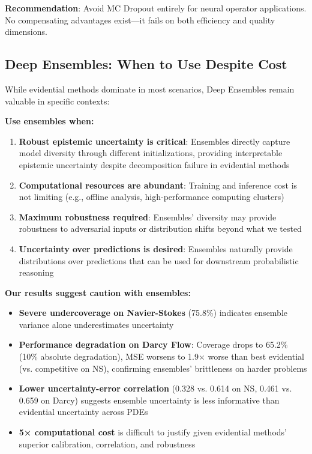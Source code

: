 \textbf{Recommendation}: Avoid MC Dropout entirely for neural operator applications. No compensating advantages exist—it fails on both efficiency and quality dimensions.

\subsection{Deep Ensembles: When to Use Despite Cost}

While evidential methods dominate in most scenarios, Deep Ensembles remain valuable in specific contexts:

\textbf{Use ensembles when:}
\begin{enumerate}
\item \textbf{Robust epistemic uncertainty is critical}: Ensembles directly capture model diversity through different initializations, providing interpretable epistemic uncertainty despite decomposition failure in evidential methods

\item \textbf{Computational resources are abundant}: Training and inference cost is not limiting (e.g., offline analysis, high-performance computing clusters)

\item \textbf{Maximum robustness required}: Ensembles' diversity may provide robustness to adversarial inputs or distribution shifts beyond what we tested

\item \textbf{Uncertainty over predictions is desired}: Ensembles naturally provide distributions over predictions that can be used for downstream probabilistic reasoning
\end{enumerate}

\textbf{Our results suggest caution with ensembles:}
\begin{itemize}
\item \textbf{Severe undercoverage on Navier-Stokes} (75.8\%) indicates ensemble variance alone underestimates uncertainty
\item \textbf{Performance degradation on Darcy Flow}: Coverage drops to 65.2\% (10\% absolute degradation), MSE worsens to 1.9× worse than best evidential (vs. competitive on NS), confirming ensembles' brittleness on harder problems
\item \textbf{Lower uncertainty-error correlation} (0.328 vs. 0.614 on NS, 0.461 vs. 0.659 on Darcy) suggests ensemble uncertainty is less informative than evidential uncertainty across PDEs
\item \textbf{5× computational cost} is difficult to justify given evidential methods' superior calibration, correlation, and robustness
\end{itemize}

